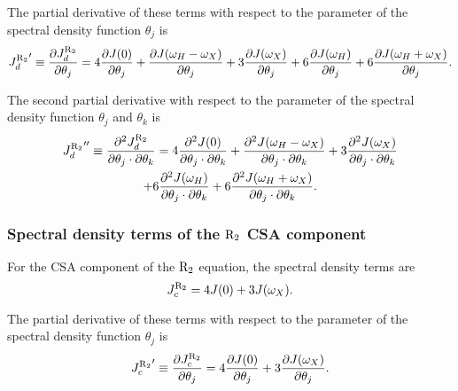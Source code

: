 \noindent The partial derivative of these terms with respect to the parameter of the spectral density function $\theta_j$ is
\begin{equation}
    {J_d^{\mathrm{R}_2}}' \equiv \frac{\partial J_d^{\mathrm{R}_2}}{\partial \theta_j}
        = 4 \frac{\partial J(0)}{\partial \theta_j}
        + \frac{\partial J(\omega_H - \omega_X)}{\partial \theta_j}
        + 3 \frac{\partial J(\omega_X)}{\partial \theta_j}
        + 6 \frac{\partial J(\omega_H)}{\partial \theta_j}
        + 6 \frac{\partial J(\omega_H + \omega_X)}{\partial \theta_j}.  \label{eq: J terms: JR2d'}
\end{equation}

\noindent The second partial derivative with respect to the parameter of the spectral density function $\theta_j$ and $\theta_k$ is
\begin{multline}
    {J_d^{\mathrm{R}_2}}'' \equiv \frac{\partial^2 J_d^{\mathrm{R}_2}}{\partial \theta_j \cdot \partial \theta_k}
        = 4 \frac{\partial^2 J(0)}{\partial \theta_j \cdot \partial \theta_k}
        + \frac{\partial^2 J(\omega_H - \omega_X)}{\partial \theta_j \cdot \partial \theta_k}
        + 3 \frac{\partial^2 J(\omega_X)}{\partial \theta_j \cdot \partial \theta_k} \\
        + 6 \frac{\partial^2 J(\omega_H)}{\partial \theta_j \cdot \partial \theta_k}
        + 6 \frac{\partial^2 J(\omega_H + \omega_X)}{\partial \theta_j \cdot \partial \theta_k}.  \label{eq: J terms: JR2d"}
\end{multline}


\subsubsection{Spectral density terms of the $\mathrm{R}_2$ CSA component}

For the CSA component of the $\mathrm{R}_2$ equation, the spectral density terms are
\begin{equation}
    J_c^{\mathrm{R}_2} = 4J(0) + 3J(\omega_X).  \label{eq: J terms: JR2c}
\end{equation}

\noindent The partial derivative of these terms with respect to the parameter of the spectral density function $\theta_j$ is
\begin{equation}
    {J_c^{\mathrm{R}_2}}' \equiv \frac{\partial J_c^{\mathrm{R}_2}}{\partial \theta_j}
        = 4 \frac{\partial J(0)}{\partial \theta_j}
        + 3 \frac{\partial J(\omega_X)}{\partial \theta_j}.  \label{eq: J terms: JR2c'}
\end{equation}

